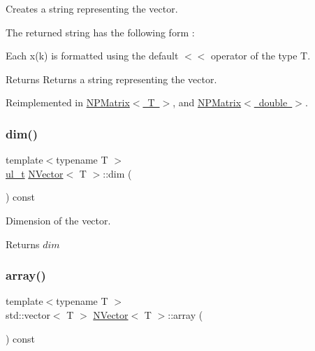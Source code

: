 Creates a string representing the vector. 

The returned string has the following form \+:


\begin{DoxyCode}{0}
\end{DoxyCode}
 Each {\ttfamily x(k)} is formatted using the default {\ttfamily $<$$<$} operator of the type {\ttfamily T}.

\begin{DoxyReturn}{Returns}
Returns a string representing the vector. 
\end{DoxyReturn}


Reimplemented in \mbox{\hyperlink{class_n_p_matrix_ac60d089a0a4b6d0a1df3cf549f50028d}{N\+P\+Matrix$<$ T $>$}}, and \mbox{\hyperlink{class_n_p_matrix_ac60d089a0a4b6d0a1df3cf549f50028d}{N\+P\+Matrix$<$ double $>$}}.

\mbox{\label{class_n_vector_a7589027db20509ac4d93490bb9a1979a}} 
\subsubsection{\texorpdfstring{dim()}{dim()}}
{\footnotesize\ttfamily template$<$typename T $>$ \\
\mbox{\hyperlink{group___n_algebra_ga1b140a2034db3f5dfe18a987745df43a}{ul\+\_\+t}} \mbox{\hyperlink{class_n_vector}{N\+Vector}}$<$ T $>$\+::dim (\begin{DoxyParamCaption}{ }\end{DoxyParamCaption}) const}



Dimension of the vector. 

\begin{DoxyReturn}{Returns}
$ dim $ 
\end{DoxyReturn}
\mbox{\label{class_n_vector_aa99d9fea7e30357df42f736013506fe1}} 
\subsubsection{\texorpdfstring{array()}{array()}}
{\footnotesize\ttfamily template$<$typename T $>$ \\
std\+::vector$<$ T $>$ \mbox{\hyperlink{class_n_vector}{N\+Vector}}$<$ T $>$\+::array (\begin{DoxyParamCaption}{ }\end{DoxyParamCaption}) const}



